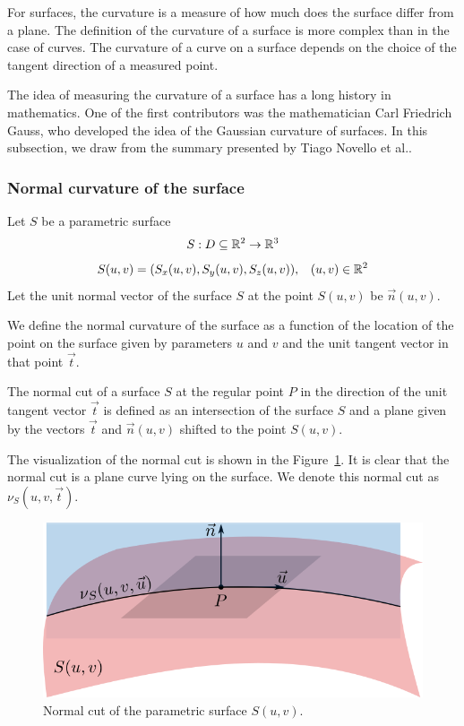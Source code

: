 For surfaces, the curvature is a measure of how much does the surface differ from a 
plane. The definition of the curvature of a surface is more complex than in the case of curves. The curvature of a curve on a surface depends on the 
choice of the tangent direction of a measured point.

The idea of measuring the curvature of a surface has a long history in mathematics.
One of the first contributors was the mathematician Carl Friedrich Gauss, who developed
the idea of the Gaussian curvature of surfaces. In this subsection, we draw from
the summary presented by Tiago Novello et al.\cite{novello2021differential}.

\subsubsection*{Normal curvature of the surface}

Let $S$ be a parametric surface $$S: D \subseteq \mathbb{R}^2 \to \mathbb{R}^3$$ 
$$S(u, v) = (S_x(u,v), S_y(u,v), S_z(u,v)), \hspace{3mm} (u,v)\in \mathbb{R}^2$$
Let the unit normal vector of the surface $S$ at the point $S(u, v)$ be $\vec{n}(u, v)$.

We define the normal curvature of the surface as a function of the location of the point
on the surface given by parameters $u$ and $v$ and the unit tangent vector in that point $\vec{t}$. 

\begin{definition}
The normal cut of a surface $S$ at the regular point $P$ in the direction of the unit tangent vector 
$\vec{t}$ is defined as an intersection of the surface $S$ and a plane
given by the vectors $\vec{t}$ and $\vec{n}(u, v)$ shifted to 
the point $S(u, v)$. 
\end{definition}

The visualization of the normal cut is shown in the Figure~\ref{img:14}.
It is clear that the
normal cut is a plane curve lying on the surface. We denote this normal cut as $\nu_S(u, v, \vec{t})$.

\begin{figure}
    \centerline{\includegraphics[scale=0.5]{images/img14}}
    \caption[Normal cut]
    {Normal cut of the parametric surface $S(u,v)$.}
    \label{img:14}
\end{figure}

